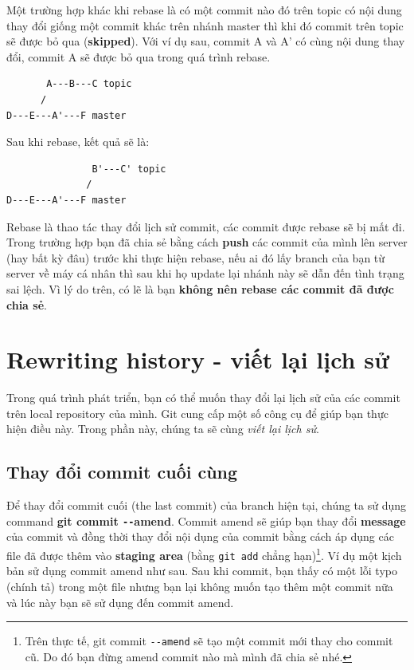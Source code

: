 \documentclass[a4paper, 11pt]{article}
\begin{document}
Một trường hợp khác khi rebase là có một commit nào đó trên topic có nội dung thay đổi giống một commit khác trên nhánh master thì khi đó commit trên topic sẽ được bỏ qua (\textbf{skipped}). Với ví dụ sau, commit A và A' có cùng nội dung thay đổi, commit A sẽ được bỏ qua trong quá trình rebase.
 
\begin{verbatim}
       A---B---C topic
      /
D---E---A'---F master
\end{verbatim}

\noindent Sau khi rebase, kết quả sẽ là:
\begin{verbatim}
               B'---C' topic
              /
D---E---A'---F master
\end{verbatim}

Rebase là thao tác thay đổi lịch sử commit, các commit được rebase sẽ bị mất đi. Trong trường hợp bạn đã chia sẻ bằng cách \textbf{push} các commit của mình lên server (hay bất kỳ đâu) trước khi thực hiện rebase, nếu ai đó lấy branch của bạn từ server về máy cá nhân thì sau khi họ update lại nhánh này sẽ dẫn đến tình trạng sai lệch. Vì lý do trên, có lẽ là bạn \textbf{không nên rebase các commit đã được chia sẻ}.

\section{Rewriting history - viết lại lịch sử}
Trong quá trình phát triển, bạn có thể muốn thay đổi lại lịch sử của các commit trên local repository của mình. Git cung cấp một số công cụ để giúp bạn thực hiện điều này. Trong phần này, chúng ta sẽ cùng \textit{viết lại lịch sử}.

\subsection{Thay đổi commit cuối cùng} \label{git-amend}
Để thay đổi commit cuối (the last commit) của branch hiện tại, chúng ta sử dụng command \textbf{git commit \texttt{-{}-}amend}. Commit amend sẽ giúp bạn thay đổi \textbf{message} của commit và đồng thời thay đổi nội dụng của commit bằng cách áp dụng các file đã được thêm vào \textbf{staging area} (bằng \texttt{git add} chẳng hạn)\footnote{Trên thực tế, git commit  \texttt{-{}-amend} sẽ tạo một commit mới thay cho commit cũ. Do đó bạn đừng amend commit nào mà mình đã chia sẻ nhé.}. Ví dụ một kịch bản sử dụng commit amend như sau. Sau khi commit, bạn thấy có một lỗi typo (chính tả) trong một file nhưng bạn lại không muốn tạo thêm một commit nữa và lúc này bạn sẽ sử dụng đến commit amend.
\end{document}
